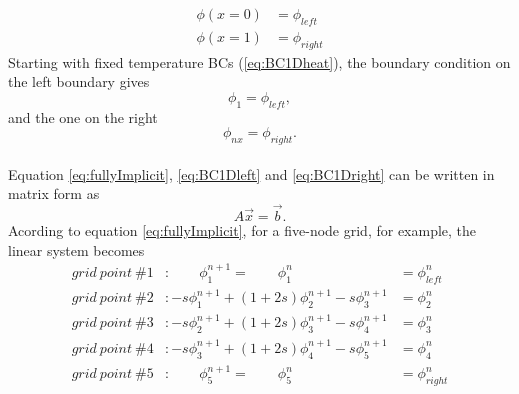 \begin{align}
\label{eq:BC1Dheat}
\phi(x=0)&=\phi_{left} \\
\phi(x=1)&=\phi_{right}
\end{align}
Starting with fixed temperature BCs (\ref{eq:BC1Dheat}), the boundary condition on the left boundary gives
\begin{equation}
\label{eq:BC1Dleft}
\phi_1=\phi_{left},
\end{equation}
and the one on the right 
\begin{equation}
\label{eq:BC1Dright}
\phi_{nx}=\phi_{right}.
\end{equation}
\\
Equation \ref{eq:fullyImplicit}, \ref{eq:BC1Dleft} and \ref{eq:BC1Dright} can be written in matrix form as
\begin{equation}
\label{eq:1DlinearSys}
A\vec{x}=\vec{b}.
\end{equation}
Acording to equation \ref{eq:fullyImplicit}, for a five-node grid, for example, the linear system becomes
\begin{align*}
  grid \ point \ \# 1&: \qquad \phi^{n+1}_{1}= \qquad \phi^{n}_{1} &=\phi^{n}_{left} \\
  grid \ point \ \# 2&: -s \phi^{n+1}_{1} + (1+2s)\phi^{n+1}_{2} -s \phi^{n+1}_{3} &= \phi^{n}_{2} \\
  grid \ point \ \# 3&: -s \phi^{n+1}_{2} + (1+2s)\phi^{n+1}_{3} -s \phi^{n+1}_{4} &= \phi^{n}_{3} \\
  grid \ point \ \# 4&: -s \phi^{n+1}_{3} + (1+2s)\phi^{n+1}_{4} -s \phi^{n+1}_{5} &= \phi^{n}_{4} \\
  grid \ point \ \# 5&: \qquad \phi^{n+1}_{5}= \qquad \phi^{n}_{5} &=\phi^{n}_{right} \\
\label{eq:1D5node}
\end{align*}

